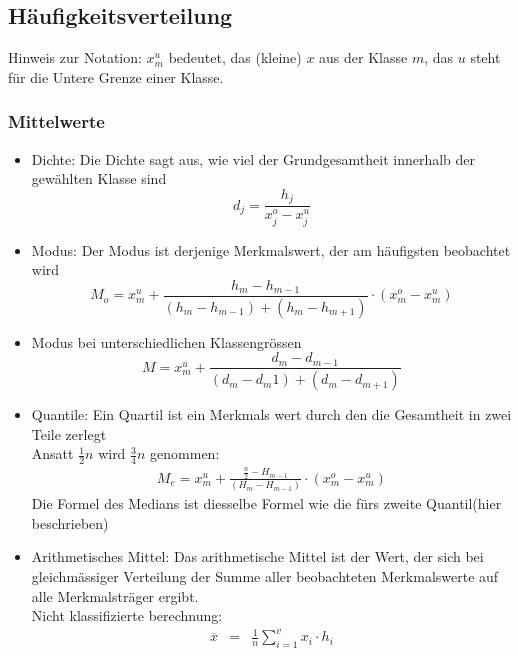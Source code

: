 \subsection{Häufigkeitsverteilung}
Hinweis zur Notation: $x_m^u$ bedeutet, das (kleine) $x$ aus der Klasse $m$, das $u$ steht für die Untere Grenze einer Klasse. 
\subsubsection{Mittelwerte}
\begin{itemize}
	\item Dichte: Die Dichte sagt aus, wie viel der Grundgesamtheit innerhalb der gewählten Klasse sind
	\begin{equation}\label{theorie:mittelwerte:dicht}
	d_j = \frac{h_j}{x_j^o-x_j^u}
	\end{equation}
	\item Modus: Der Modus ist derjenige Merkmalswert, der am häufigsten beobachtet wird %
	\begin{equation}\label{theorie:mittelwerte:modus:1}
	M_{o}=x_{m}^{u}+\frac{h_{m}-h_{m-1}}{(h_{m}-h_{m-1})+(h_{m}-h_{m+1})}\cdot(x_{m}^{o}-x_{m}^{u})
	\end{equation}
	\item Modus bei unterschiedlichen Klassengrössen
	\begin{equation}\label{theorie:mittelwerte:modus:2}
	M = x_m^u + \frac{d_m-d_{m-1}}{(d_m-d_m1)+(d_m-d_{m+1})}
	\end{equation}
	\item Quantile: Ein Quartil ist ein Merkmals wert durch den die Gesamtheit in zwei Teile zerlegt\\
	Ansatt $\frac{1}{2} n$ wird $\frac{3}{4} n$ genommen:\\
	\begin{eqnarray}\label{theorie:mittelwerte:quant}
	M_{e}=x_{m}^{u}+\frac{\frac{n}{2}-H_{m-1}}{(H_{m}-H_{m-1})}\cdot(x_{m}^{o}-x_{m}^{u})
	\end{eqnarray}
	Die Formel des Medians ist diesselbe Formel wie die fürs zweite Quantil(hier beschrieben)
	\item Arithmetisches Mittel: Das arithmetische Mittel ist der Wert, der sich bei gleichmässiger Verteilung der Summe aller beobachteten Merkmalswerte auf alle Merkmalsträger ergibt.\\
	Nicht klassifizierte berechnung:
	\begin{eqnarray} \label{theorie:mittelwerte:arith}
	\overline{x}&=&\frac{1}{n}\sum_{i=1}^{v}x_i\cdot h_i\\

\end{eqnarray}
\end{itemize}
